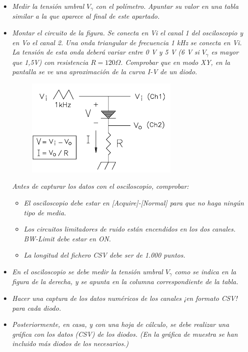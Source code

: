 \documentclass[paper=a4, fontsize=11pt]{scrartcl} %
\numberwithin{equation}{section} %
\numberwithin{figure}{section} %
\numberwithin{table}{section} %
\begin{document}
\begin{itemize}
	\item \textit{Medir la tensión umbral $ V_{\gamma} $ con el polímetro. Apuntar su valor en una tabla similar a la que aparece al final de este apartado.} 

	\item \textit{Montar el circuito de la figura. Se conecta en Vi el canal 1 del osciloscopio y en Vo el canal 2. Una onda triangular de frecuencia 1 kHz se conecta en Vi. La tensión de esta onda deberá variar entre 0 V y 5 V (6 V si $ V_{\gamma} $ es mayor que 1,5V) con resistencia $ R=120 \Omega $. Comprobar que en modo XY, en la pantalla se ve una aproximación de la curva I-V de un diodo.} 

	\begin{figure}[h]
	\centering
	\includegraphics[width=0.4\linewidth]{image/screenshot002}
	\end{figure}

	\textit{Antes de capturar los datos con el osciloscopio, comprobar:} 
	\begin{itemize}
		\item \textit{El osciloscopio debe estar en [Acquire]-[Normal] para que no haga ningún tipo de media.}
		\item \textit{Los circuitos limitadores de ruido están encendidos en los dos canales. BW-Limit debe estar en ON.}
		\item \textit{La longitud del fichero CSV debe ser de 1.000 puntos.}
	\end{itemize}
	
	\item \textit{En el osciloscopio se debe medir la tensión umbral $ V_{\gamma} $ como se indica en la figura de la derecha, y se apunta en la columna correspondiente de la tabla.}

	\item \textit{Hacer una captura de los datos numéricos de los canales ¡en formato CSV! para cada diodo.}
	
	\item \textit{Posteriormente, en casa, y con una hoja de cálculo, se debe realizar una gráfica con los datos (CSV) de los diodos. (En la gráfica de muestra se han incluido más diodos de los necesarios.)}
	

\end{itemize}
\end{document}
